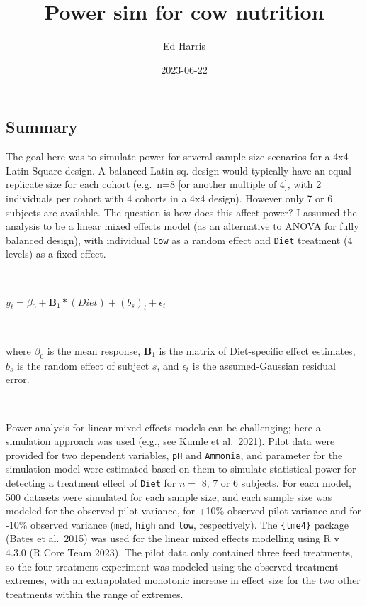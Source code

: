 \documentclass[
]{article}
\title{Power sim for cow nutrition}
\author{Ed Harris}
\date{2023-06-22}
\begin{document}
\maketitle

\hypertarget{summary}{%
\subsection{Summary}\label{summary}}

The goal here was to simulate power for several sample size scenarios
for a 4x4 Latin Square design. A balanced Latin sq. design would
typically have an equal replicate size for each cohort (e.g.~n=8 {[}or
another multiple of 4{]}, with 2 individuals per cohort with 4 cohorts
in a 4x4 design). However only 7 or 6 subjects are available. The
question is how does this affect power? I assumed the analysis to be a
linear mixed effects model (as an alternative to ANOVA for fully
balanced design), with individual \texttt{Cow} as a random effect and
\texttt{Diet} treatment (4 levels) as a fixed effect.

~

\(y_t = \beta_0 + \boldsymbol{B}_1 * (Diet) + (b_s)_t + \epsilon_t\)

~

where \(\beta_0\) is the mean response, \(\boldsymbol{B}_1\) is the
matrix of Diet-specific effect estimates, \(b_s\) is the random effect
of subject \(s\), and \(\epsilon_t\) is the assumed-Gaussian residual
error.

~

Power analysis for linear mixed effects models can be challenging; here
a simulation approach was used (e.g., see Kumle et al.~2021). Pilot data
were provided for two dependent variables, \texttt{pH} and
\texttt{Ammonia}, and parameter for the simulation model were estimated
based on them to simulate statistical power for detecting a treatment
effect of \texttt{Diet} for \(n=\) 8, 7 or 6 subjects. For each model,
500 datasets were simulated for each sample size, and each sample size
was modeled for the observed pilot variance, for +10\% observed pilot
variance and for -10\% observed variance (\texttt{med}, \texttt{high}
and \texttt{low}, respectively). The \texttt{\{lme4\}} package (Bates et
al.~2015) was used for the linear mixed effects modelling using R v
4.3.0 (R Core Team 2023). The pilot data only contained three feed
treatments, so the four treatment experiment was modeled using the
observed treatment extremes, with an extrapolated monotonic increase in
effect size for the two other treatments within the range of extremes.
\end{document}
